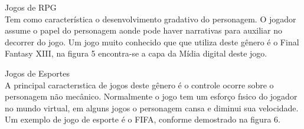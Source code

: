 \begin{alineascomponto}
\item Jogos de RPG\\
Tem como característica o desenvolvimento gradativo do personagem. O jogador assume o papel do personagem aonde pode haver narrativas para auxiliar no decorrer do jogo.
Um jogo muito conhecido que que utiliza deste gênero é o Final Fantasy XIII,  na figura 5 encontra-se a capa da Mídia digital deste jogo. \cite{gen1}
\end{alineascomponto}

\begin{figure}[h!]
		\centering
	\end{figure}
	
\begin{alineascomponto}
\item Jogos de Esportes\\
A principal caracterıstica de jogos deste gênero é o controle ocorre sobre o personagem não mecânico. Normalmente o jogo tem um esforço fısico do jogador no
mundo virtual, em alguns jogos o personagem cansa e diminui sua velocidade. Um exemplo de jogo de esporte é o FIFA, conforme demostrado na figura 6. \cite{gen1}
\end{alineascomponto}
\begin{figure}[h!]
		\centering
	\end{figure}

